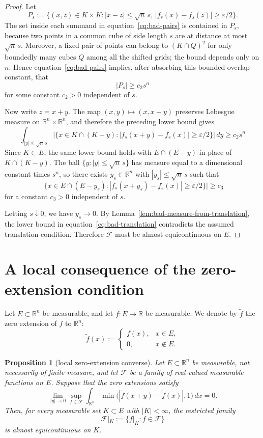 \documentclass[11pt]{article}
\theoremstyle{plain}
\newtheorem{proposition}{Proposition}
\theoremstyle{definition}
\theoremstyle{remark}
\newcommand{\R}{\mathbb{R}}
\newcommand{\F}{\mathcal{F}}
\newcommand{\eps}{\varepsilon}
\newcommand{\meas}[1]{\lvert #1\rvert}
\begin{document}
\begin{proof}
Let
\[
    P_s:=
    \{(x,z)\in K\times K: |x-z|\le\sqrt n\,s,\,
    |f_s(x)-f_s(z)|\ge\eps/2\}.
\]
The set inside each summand in equation~\eqref{eq:bad-pairs} is contained in
$P_s$, because two points in a common cube of side length $s$ are at distance
at most $\sqrt n\,s$. Moreover, a fixed pair of points can belong to
$(K\cap Q)^2$ for only boundedly many cubes $Q$ among all the shifted grids;
the bound depends only on $n$. Hence equation~\eqref{eq:bad-pairs} implies,
after absorbing this bounded-overlap constant, that
\[
    \meas{P_s}\ge c_2s^n
\]
for some constant $c_2>0$ independent of $s$.

Now write $z=x+y$. The map $(x,y)\mapsto(x,x+y)$ preserves Lebesgue measure
on $\R^n\times\R^n$, and therefore the preceding lower bound gives
\[
    \int_{|y|\le\sqrt n\,s}
    \meas{\{x\in K\cap(K-y):
    |f_s(x+y)-f_s(x)|\ge\eps/2\}}\,dy
    \ge c_2s^n
\]
Since $K\subset E$, the same lower bound holds with $E\cap(E-y)$ in place
of $K\cap(K-y)$. The ball
$\{y:|y|\le\sqrt n\,s\}$ has measure equal to a dimensional constant times
$s^n$, so there exists $y_s\in\R^n$ with $|y_s|\le\sqrt n\,s$ such that
\begin{equation}\label{eq:bad-translation}
    \meas{\{x\in E\cap(E-y_s):
    |f_s(x+y_s)-f_s(x)|\ge\eps/2\}}\ge c_3
\end{equation}
for a constant $c_3>0$ independent of $s$.

Letting $s\downarrow0$, we have $y_s\to0$. By
Lemma~\ref{lem:bad-measure-from-translation}, the lower bound in
equation~\eqref{eq:bad-translation} contradicts the assumed translation
condition.
Therefore $\F$ must be almost equicontinuous on $E$.
\end{proof}

\section{A local consequence of the zero-extension condition}

Let $E\subset\R^n$ be measurable, and let $f:E\to\R$ be measurable. We denote
by $\widetilde f$ the zero extension of $f$ to $\R^n$:
\[
    \widetilde f(x):=
    \begin{cases}
        f(x), & x\in E,\\
        0, & x\notin E.
    \end{cases}
\]

\begin{proposition}[local zero-extension converse]
\label{prop:local-zero-extension-converse}
Let $E\subset\R^n$ be measurable, not necessarily of finite measure, and let
$\F$ be a family of real-valued measurable functions on $E$. Suppose that the
zero extensions satisfy
\[
    \lim_{|y|\to0}\sup_{f\in\F}
    \int_{\R^n}
    \min\bigl(|\widetilde f(x+y)-\widetilde f(x)|,1\bigr)\,dx=0.
\]
Then, for every measurable set $K\subset E$ with $\meas{K}<\infty$, the
restricted family
\[
    \F|_K:=\{f|_K:f\in\F\}
\]
is almost equicontinuous on $K$.
\end{proposition}
\end{document}
